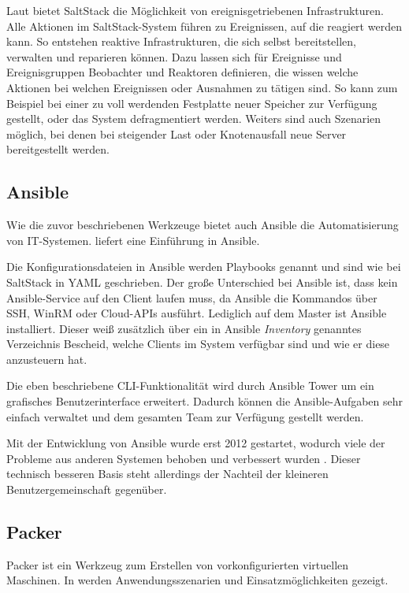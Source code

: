 Laut \autocite{SaltStack-Event:online} bietet SaltStack die Möglichkeit von ereignisgetriebenen Infrastrukturen.
Alle Aktionen im SaltStack-System führen zu Ereignissen, auf die reagiert werden kann.
So entstehen reaktive Infrastrukturen, die sich selbst bereitstellen, verwalten und reparieren können.
Dazu lassen sich für Ereignisse und Ereignisgruppen Beobachter und Reaktoren definieren, die wissen welche Aktionen bei welchen Ereignissen oder Ausnahmen zu tätigen sind.
So kann zum Beispiel bei einer zu voll werdenden Festplatte neuer Speicher zur Verfügung gestellt, oder das System defragmentiert werden.
Weiters sind auch Szenarien möglich, bei denen bei steigender Last oder Knotenausfall neue Server bereitgestellt werden.

\subsection{Ansible}
\label{sub:ansible}
Wie die zuvor beschriebenen Werkzeuge bietet auch Ansible die Automatisierung von IT-Systemen.
\autocite{Ansible:online} liefert eine Einführung in Ansible.

Die Konfigurationsdateien in Ansible werden Playbooks genannt und sind wie bei SaltStack in YAML geschrieben.
Der große Unterschied bei Ansible ist, dass kein Ansible-Service auf den Client laufen muss, da Ansible die Kommandos über SSH, WinRM oder Cloud-APIs ausführt.
Lediglich auf dem Master ist Ansible installiert.
Dieser weiß zusätzlich über ein in Ansible \emph{Inventory} genanntes Verzeichnis Bescheid, welche Clients im System verfügbar sind und wie er diese anzusteuern hat.

Die eben beschriebene CLI-Funktionalität wird durch Ansible Tower um ein grafisches Benutzerinterface erweitert.
Dadurch können die Ansible-Aufgaben sehr einfach verwaltet und dem gesamten Team zur Verfügung gestellt werden.

Mit der Entwicklung von Ansible wurde erst 2012 gestartet, wodurch viele der Probleme aus anderen Systemen behoben und verbessert wurden \autocite{Wolff201604}. Dieser technisch besseren Basis steht allerdings der Nachteil der kleineren Benutzergemeinschaft gegenüber.

\subsection{Packer}
\label{sub:packer}
Packer ist ein Werkzeug zum Erstellen von vorkonfigurierten virtuellen Maschinen.
In \autocite{Packer:online} werden Anwendungsszenarien und Einsatzmöglichkeiten gezeigt.

